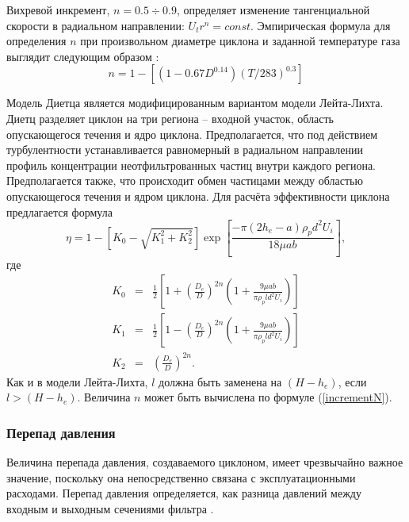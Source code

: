 			Вихревой инкремент, $n = 0.5 \div 0.9$, определяет изменение тангенциальной скорости в радиальном направлении: $U_tr^n = const$. Эмпирическая формула для определения $n$ при произвольном диаметре циклона и заданной температуре газа выглядит следующим образом \cite{Alexander}:
			\begin{equation}
				\label{incrementN}
				n = 1 - \left[ (1-0.67D^{0.14})(T/283)^{0.3} \right]
			\end{equation}
			
			Модель Диетца \cite{Dietz} является модифицированным вариантом модели Лейта-Лихта. Диетц разделяет циклон на три региона -- входной участок, область опускающегося течения и ядро циклона. Предполагается, что под действием турбулентности устанавливается равномерный в радиальном направлении профиль концентрации неотфильтрованных частиц внутри каждого региона. Предполагается также, что происходит обмен частицами между областью опускающегося течения и ядром циклона. Для расчёта эффективности циклона предлагается формула
			\begin{equation}
				\eta = 1 - \left[ K_0 - \sqrt{K_1^2 + K_2^2} \right]\exp{\left[\frac{-\pi (2h_e - a)\rho_p d^2 U_i}{18 \mu ab}\right]},
			\end{equation}
			где 
			\begin{eqnarray}
				K_0 &=& \frac{1}{2}\left[ 1 + \left(\frac{D_e}{D}\right)^{2n}\left(1+\frac{9\mu ab}{ \pi \rho_p l d^2 U_i}\right) \right] \\
				K_1 &=& \frac{1}{2}\left[ 1 - \left(\frac{D_e}{D}\right)^{2n}\left(1+\frac{9\mu ab}{ \pi \rho_p l d^2 U_i}\right) \right] \\
				K_2 &=& \left(\frac{D_e}{D}\right)^{2n}.
			\end{eqnarray}
			Как и в модели Лейта-Лихта, $l$ должна быть заменена на $(H-h_e)$, если $l>(H-h_e)$. Величина $n$ может быть вычислена по формуле (\ref{incrementN}).
	\subsubsection{Перепад давления}
		Величина перепада давления, создаваемого циклоном, имеет чрезвычайно важное значение, поскольку она непосредственно связана с эксплуатационными расходами. Перепад давления определяется, как разница давлений между входным и выходным сечениями фильтра \cite{Utikar}.